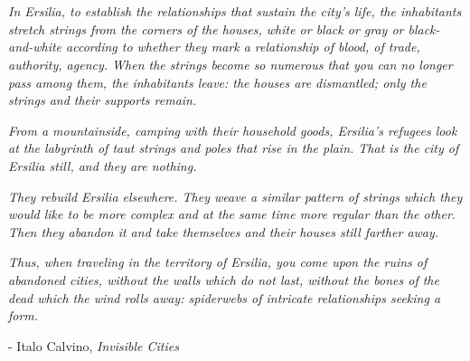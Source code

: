 \section{}

\textit{In Ersilia, to establish the relationships that sustain the city's
life, the inhabitants stretch strings from the corners of the houses, white or
black or gray or black-and-white according to whether they mark a relationship
of blood, of trade, authority, agency. When the strings become so numerous that
you can no longer pass among them, the inhabitants leave: the houses are
dismantled; only the strings and their supports remain.}

\textit{From a mountainside, camping with their household goods, Ersilia's
refugees look at the labyrinth of taut strings and poles that rise in the
plain. That is the city of Ersilia still, and they are nothing.}

\textit{They rebuild Ersilia elsewhere. They weave a similar pattern of strings
which they would like to be more complex and at the same time more regular than
the other. Then they abandon it and take themselves and their houses still
farther away.}

\textit{Thus, when traveling in the territory of Ersilia, you come upon the
ruins of abandoned cities, without the walls which do not last, without the
bones of the dead which the wind rolls away: spiderwebs of intricate
relationships seeking a form.}

- Italo Calvino, \emph{Invisible Cities}
